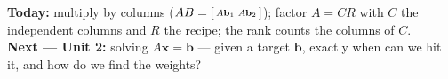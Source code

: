 \documentclass[aspectratio=169, 11pt]{beamer}
\newcommand{\xx}{\mathbf{x}}
\newcommand{\bb}{\mathbf{b}}
\begin{document}
\begin{frame}[t, plain]
  \textbf{Today:} multiply by columns ($AB=\begin{bsmallmatrix} A\mathbf{b}_1 & A\mathbf{b}_2 \end{bsmallmatrix}$);
  factor $A=CR$ with $C$ the independent columns and $R$ the recipe; the rank counts the columns of $C$.\\[8pt]
  \textbf{Next --- Unit 2:} solving $A\xx=\bb$ --- given a target $\bb$, exactly when can we hit it,
  and how do we find the weights?
\end{frame}
\end{document}
